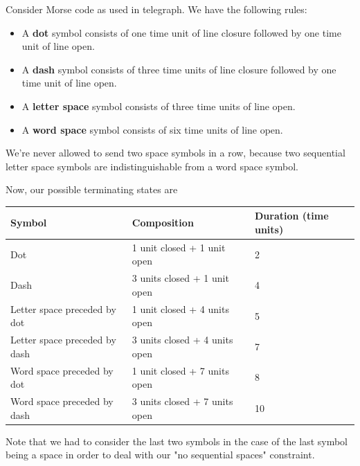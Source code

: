 \documentclass{article}
\begin{document}
\begin{example}
Consider Morse code as used in telegraph. We have the following rules:

\begin{itemize}
\item A \textbf{dot} symbol consists of one time unit of line closure followed by one time unit of line open.
\end{itemize}

\begin{itemize}
\item A \textbf{dash} symbol consists of three time units of line closure followed by one time unit of line open.
\end{itemize}

\begin{itemize}
\item A \textbf{letter space} symbol consists of three time units of line open.
\end{itemize}

\begin{itemize}
\item A \textbf{word space} symbol consists of six time units of line open.
\end{itemize}

We're never allowed to send two space symbols in a row, because two sequential letter space symbols are indistinguishable from a word space symbol.

Now, our possible terminating states are

\begin{tabular}{lll}
Symbol & Composition & Duration (time units) \\
\hline
Dot & 1 unit closed + 1 unit open & 2 \\
Dash & 3 units closed + 1 unit open & 4 \\
Letter space preceded by dot & 1 unit closed + 4 units open & 5 \\
Letter space preceded by dash & 3 units closed + 4 units open & 7 \\
Word space preceded by dot & 1 unit closed + 7 units open & 8 \\
Word space preceded by dash & 3 units closed + 7 units open & 10 \\
\end{tabular}

Note that we had to consider the last two symbols in the case of the last symbol being a space in order to deal with our "no sequential spaces" constraint.


\end{example}
\end{document}
